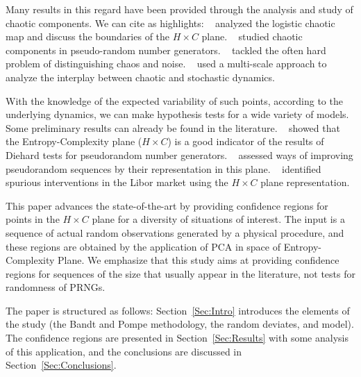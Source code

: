 Many results in this regard have been provided through the analysis and study of chaotic components.
We can cite as highlights:
\citeauthor{GeneralizedStatisticalComplexityMeasuresGeometricalAnalyticalProperties}~\citeyear{GeneralizedStatisticalComplexityMeasuresGeometricalAnalyticalProperties} analyzed the logistic chaotic map and discuss the boundaries of the $H \times C$ plane.
\citeauthor{De_Micco_2009}~\citeyear{De_Micco_2009} studied chaotic components in pseudo-random number generators.
\citeauthor{DistinguishingNoiseFromChaos}~\citeyear{DistinguishingNoiseFromChaos}  tackled the often hard problem of distinguishing chaos and noise.
\citeauthor{DistinguishingChaoticStochasticDynamicsTimeSeriesMultiscaleSymbolicApproach}~\citeyear{DistinguishingChaoticStochasticDynamicsTimeSeriesMultiscaleSymbolicApproach} used a multi-scale approach to analyze the interplay between chaotic and stochastic dynamics.

With the knowledge of the expected variability of such points, according to the underlying dynamics, we can make hypothesis tests for a wide variety of models.
Some preliminary results can already be found in the literature.
\citeauthor{Larrondo2006Random}~\citeyear{Larrondo2006Random} showed that the Entropy-Complexity plane ($H\times C$) is a good indicator of the results of Diehard tests for pseudorandom number generators.
\citeauthor{De_Micco_2008}~\citeyear{De_Micco_2008} assessed ways of improving pseudorandom sequences by their representation in this plane.
\citeauthor{LiborInvisibleHand}~\citeyear{LiborInvisibleHand} identified spurious interventions in the Libor market using the $H\times C$ plane representation.

This paper advances the state-of-the-art by providing confidence regions for points in the $H\times C$ plane for a diversity of situations of interest.
The input is a sequence of actual random observations generated by a physical procedure, and these regions are obtained by the application of PCA in space of Entropy-Complexity Plane.
We emphasize that this study aims at providing confidence regions for sequences of the size that usually appear in the literature, not tests for randomness of PRNGs.


The paper is structured as follows: Section~\ref{Sec:Intro} introduces the elements of the study (the Bandt and Pompe methodology, the random deviates, and model).
The confidence regions are presented in Section~\ref{Sec:Results} with some analysis of this application, and the conclusions are discussed in Section~\ref{Sec:Conclusions}.

